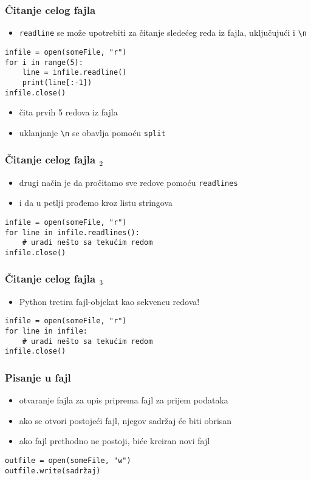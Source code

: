 \documentclass[utf8,compress,aspectratio=169]{beamer}
\begin{document}
\begin{frame}[fragile]
  \frametitle{Čitanje celog fajla}
  \begin{itemize}
    \item \texttt{readline} se može upotrebiti za čitanje sledećeg reda iz fajla, uključujući i \texttt{\textbackslash n}
  \end{itemize}
\begin{verbatim}
infile = open(someFile, "r")
for i in range(5):
    line = infile.readline()
    print(line[:-1])
infile.close()
\end{verbatim}
  \begin{itemize}
    \item čita prvih 5 redova iz fajla
    \item uklanjanje \texttt{\textbackslash n} se obavlja pomoću \texttt{split}
  \end{itemize}
\end{frame}

\begin{frame}[fragile]
  \frametitle{Čitanje celog fajla $_2$}
  \begin{itemize}
    \item drugi način je da pročitamo sve redove pomoću \texttt{readlines}
    \item i da u petlji prođemo kroz listu stringova
  \end{itemize}
\begin{verbatim}
infile = open(someFile, "r")
for line in infile.readlines():
    # uradi nešto sa tekućim redom
infile.close()
\end{verbatim}
\end{frame}


\begin{frame}[fragile]
  \frametitle{Čitanje celog fajla $_3$}
  \begin{itemize}
    \item Python tretira fajl-objekat kao sekvencu redova!
  \end{itemize}
\begin{verbatim}
infile = open(someFile, "r")
for line in infile:
    # uradi nešto sa tekućim redom
infile.close()
\end{verbatim}
\end{frame}

\begin{frame}[fragile]
  \frametitle{Pisanje u fajl}
  \begin{itemize}
    \item otvaranje fajla za upis priprema fajl za prijem podataka
    \item ako se otvori postojeći fajl, njegov sadržaj će biti obrisan
    \item ako fajl prethodno ne postoji, biće kreiran novi fajl
  \end{itemize}
\begin{verbatim}
outfile = open(someFile, "w")
outfile.write(sadržaj)
\end{verbatim}
\end{frame}
\end{document}
